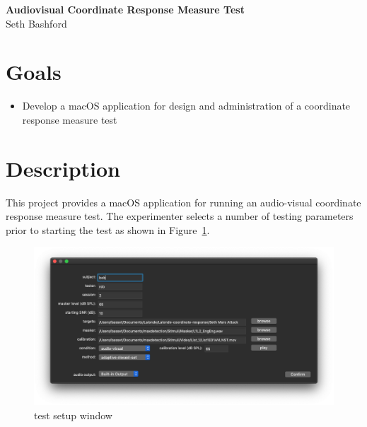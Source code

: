 \documentclass[11pt,pdftex,letterpaper]{article}
\begin{document}
\vspace*{30ex}
\begin{center}
\textbf{Audiovisual Coordinate Response Measure Test}\\
\vspace{4ex}
Seth Bashford
\end{center}
\pagebreak
\tableofcontents
\pagebreak

\section{Goals}
\begin{itemize}
\item Develop a macOS application for design and administration of a coordinate response measure test
\end{itemize}

\section{Description}
This project provides a macOS application for running an audio-visual coordinate response measure test. The experimenter selects a number of testing parameters prior to starting the test as shown in Figure~\ref{fig:test-setup-window}.
\begin{figure}
\centering
\includegraphics[width = 0.9\linewidth]{test-setup-window.png}
\caption{test setup window}
\label{fig:test-setup-window}
\end{figure}
\end{document}
